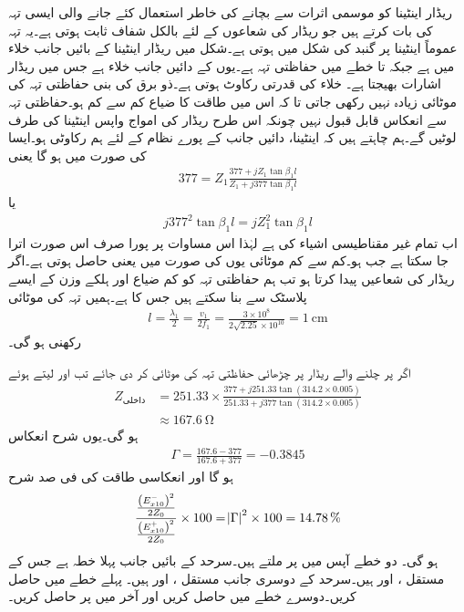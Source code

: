  ریڈار اینٹینا کو موسمی اثرات سے بچانے کی خاطر استعمال کئے جانے والی ایسی تہہ کی بات کرتے ہیں جو ریڈار کی شعاعوں کے لئے بالکل شفاف ثابت ہوتی ہے۔یہ تہہ عموماً اینٹینا پر گنبد کی شکل میں ہوتی ہے۔شکل  میں ریڈار اینٹینا  کے بائیں جانب خلاء میں ہے جبکہ  تا  خطے میں حفاظتی تہہ ہے۔یوں  کے دائیں جانب خلاء ہے جس میں ریڈار اشارات بھیجتا ہے۔ خلاء کی قدرتی رکاوٹ  ہوتی ہے۔ذو برق کی بنی حفاظتی تہہ کی موٹائی زیادہ نہیں رکھی جاتی تا کہ اس میں طاقت کا ضیاع کم سے کم ہو۔حفاظتی تہہ سے انعکاس قابل قبول نہیں چونکہ اس طرح ریڈار کی امواج واپس اینٹینا کی طرف لوٹیں گے۔ہم چاہتے ہیں کہ اینٹینا، دائیں جانب کے پورے نظام کے لئے ہم رکاوٹی ہو۔ایسا  کی صورت میں ہو گا یعنی
\begin{align*}
377=Z_1 \frac{377+jZ_1 \tan \beta_1 l}{Z_1+j 377 \tan \beta_1 l}
\end{align*}
یا
\begin{align*}
j 377^2 \tan \beta_1 l =j Z_1^2 \tan \beta_1 l
\end{align*}
اب تمام غیر مقناطیسی اشیاء کی  ہے لہٰذا اس مساوات پر پورا صرف اس صورت اترا جا سکتا ہے جب  ہو۔کم سے کم موٹائی یوں  کی صورت میں  یعنی  حاصل ہوتی ہے۔اگر ریڈار  کی شعاعیں پیدا کرتا ہو تب ہم حفاظتی تہہ کو کم ضیاع اور ہلکے وزن کے ایسے  پلاسٹک  سے بنا سکتے ہیں جس کا  ہے۔ہمیں تہہ کی موٹائی
\begin{align*}
l=\frac{\lambda_1}{2}=\frac{v_1}{2 f_1}=\frac{3\times 10^8}{2 \sqrt{2.25} \times 10^{10}}=\SI{1}{\centi\meter}
\end{align*}
رکھنی ہو گی۔

اگر  پر چلنے والے ریڈار پر چڑھائی حفاظتی تہہ کی موٹائی  کر دی جائے تب  اور  لیتے ہوئے
\begin{align*}
Z_{\text{داخلی}}&=251.33 \times \frac{377+j 251.33 \tan (314.2 \times 0.005)}{251.33+j 377 \tan(314.2\times 0.005)}\\
&\approx \SI{167.6}{\ohm}
\end{align*}
ہو گی۔یوں شرح انعکاس
\begin{align*}
\Gamma=\frac{167.6-377}{167.6+377}=-0.3845
\end{align*}
ہو گا اور انعکاسی طاقت کی فی صد شرح
\begin{align*}
\frac{\frac{\left(E_{x10}^-\right)^2}{2Z_0}}{\frac{\left(E_{x10}^+\right)^2}{2Z_0}} \times 100=\abs{\Gamma}^2 \times 100=\SI{14.78}{\%}
\end{align*}
ہو گی۔
دو خطے آپس میں  پر ملتے ہیں۔سرحد کے بائیں جانب پہلا خطہ ہے جس کے مستقل ،  اور  ہیں۔سرحد کے دوسری جانب مستقل ،  اور  ہیں۔ پہلے خطے میں  حاصل کریں۔دوسرے خطے میں  حاصل کریں اور آخر میں  پر  حاصل کریں۔

